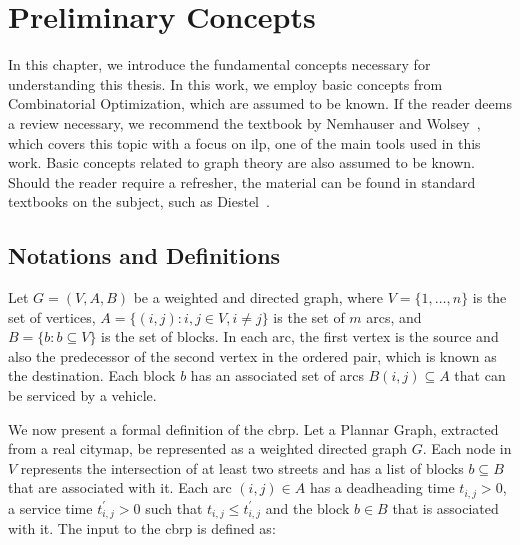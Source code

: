 \chapter{Preliminary Concepts}\label{chp:preliminary-concepts}

In this chapter, we introduce the fundamental concepts necessary for
understanding this thesis. In this work, we employ basic concepts from
Combinatorial Optimization, which are assumed to be known. If the reader deems a
review necessary, we recommend the textbook by Nemhauser and
Wolsey~\cite{Nemhauser}, which covers this topic with a focus on \gls{ilp}, one
of the main tools used in this work. Basic concepts related to graph theory are
also assumed to be known. Should the reader require a refresher, the material
can be found in standard textbooks on the subject, such as
Diestel~\cite{diestel:2005}.


\section{Notations and Definitions}\label{sec:not-e-def}

Let $G = (V, A, B)$ be a weighted and directed graph, where $V = \{1, \dots,
	n\}$ is the set of vertices, $A = \{(i, j) : i, j \in V, i \neq j\}$ is the
set of $m$ arcs, and $B = \{b : b \subseteq V\}$ is the set of blocks. In
each arc, the first vertex is the source and also the predecessor of the
second vertex in the ordered pair, which is known as the destination. Each
block $b$ has an associated set of arcs $B(i, j) \subseteq A$ that can be
serviced by a vehicle. 

We now present a formal definition of the \gls{cbrp}. Let a Plannar Graph,
extracted from a real citymap, be represented as a weighted directed graph $G$.
Each node in $V$ represents the intersection of at least two streets and has a
list of blocks $b \subseteq B$ that are associated with it. Each arc $(i, j) \in
	A$ has a deadheading time $t_{i, j} > 0$, a service time $t^{'}_{i, j} > 0$ such
that $t_{i, j} \leqslant t^{'}_{i, j}$ and the block $b \in B$ that is
associated with it. The input to the \gls{cbrp} is defined as:

